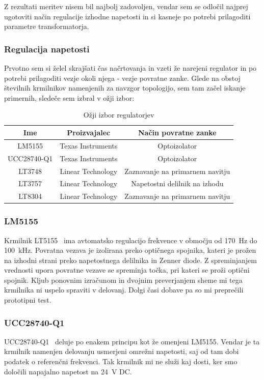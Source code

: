 \documentclass[a4paper,twoside,openright,12pt,Slovene]{book}
\begin{document}
Z rezultati meritev nisem bil najbolj zadovoljen, vendar sem se odločil najprej ugotoviti način regulacije izhodne napetosti in si kasneje po potrebi prilagoditi parametre transformatorja. 

	\subsubsection{Regulacija napetosti} \label{RegulacijaNapetosti}
	Prvotno sem si želel skrajšati čas načrtovanja in vzeti že narejeni regulator in po potrebi prilagoditi vezje okoli njega - vezje povratne zanke. Glede na obstoj številnih krmilnikov namenjenih za navzgor topologijo, sem tam začel iskanje primernih, sledeče sem izbral v ožji izbor:
	
\begin{table}[h!]
\centering
\begin{tabular}{||c | c |c||}
\hline
Ime & Proizvajalec & Način povratne zanke \\[0.5ex]
\hline\hline
LM5155 & Texas Instruments & Optoizolator \\
UCC28740-Q1 & Texas Instruments & Optoizolator \\
LT3748 & Linear Technology & Zaznavanje na primarnem navitju \\
LT3757 & Linear Technology & Napetostni delilnik na izhodu \\
LT8304 & Linear Technology & Zaznavanje na primarnem navitju \\ [1ex]

\hline
\end{tabular}
\caption{Ožji izbor regulatorjev}
\end{table}

	\subsubsection{LM5155} \label{LM5155}
Krmilnik LT5155~\cite{TI:LT5155} ima avtomatsko regulacijo frekvence v območju od \SI{170}{\hertz} do \SI{100}{\kilo\hertz}. Povratna vezava je izolirana preko optičnega spojnika, kateri je prožen na izhodni strani preko napetostnega delilnika in Zenner diode. Z spreminjanjem vrednosti upora povratne vezave se spreminja točka, pri kateri se proži optični spojnik. Kljub ponovnim izračunom in dvojnim preverjanjem sheme mi tega krmilnika ni uspelo spraviti v delovanj. Dolgi časi dobave pa so mi preprečili prototipni test.


	\subsubsection{UCC28740-Q1} \label{UCC28740-Q1}
UCC28740-Q1~\cite{TI:UCC28740} deluje po enakem principu kot že omenjeni LM5155. Vendar je ta krmilnik namenjen delovanju usmerjeni omrežni napetosti, saj od tam dobi podatek o referenčni frekvenci. Tak krmilnik mi ne služi kaj dosti, ker smo določili napajalno napetost na \SI{24}{\volt} DC. 
\end{document}
